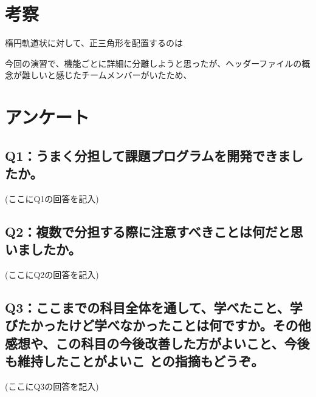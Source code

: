 \documentclass[12pt,a4j]{jarticle}
\begin{document}
\section{考察}

楕円軌道状に対して、正三角形を配置するのは

今回の演習で、機能ごとに詳細に分離しようと思ったが、ヘッダーファイルの概念が難しいと感じたチームメンバーがいたため、

\section{アンケート}

\subsection{Q1：うまく分担して課題プログラムを開発できましたか。}

(ここにQ1の回答を記入)

\subsection{Q2：複数で分担する際に注意すべきことは何だと思いましたか。}

(ここにQ2の回答を記入)

\subsection{Q3：ここまでの科目全体を通して、学べたこと、学びたかったけど学べなかったことは何ですか。その他感想や、この科目の今後改善した方がよいこと、今後も維持したことがよいこ との指摘もどうぞ。}

(ここにQ3の回答を記入)
\end{document}
